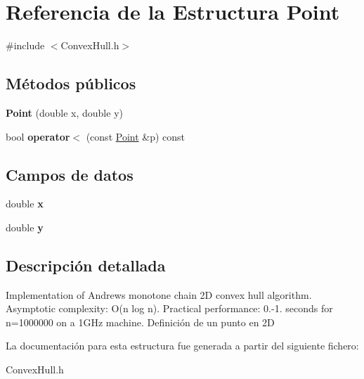 \hypertarget{structPoint}{}\section{Referencia de la Estructura Point}
\label{structPoint}


{\ttfamily \#include $<$Convex\+Hull.\+h$>$}

\subsection*{Métodos públicos}
\begin{DoxyCompactItemize}
\item 
\hypertarget{structPoint_a78b55e8d5466bb8c2cf60fa55f2562ff}{}{\bfseries Point} (double x, double y)\label{structPoint_a78b55e8d5466bb8c2cf60fa55f2562ff}

\item 
\hypertarget{structPoint_aa042f39cc8ef592350a152f407b15bce}{}bool {\bfseries operator$<$} (const \hyperlink{structPoint}{Point} \&p) const \label{structPoint_aa042f39cc8ef592350a152f407b15bce}

\end{DoxyCompactItemize}
\subsection*{Campos de datos}
\begin{DoxyCompactItemize}
\item 
\hypertarget{structPoint_ab99c56589bc8ad5fa5071387110a5bc7}{}double {\bfseries x}\label{structPoint_ab99c56589bc8ad5fa5071387110a5bc7}

\item 
\hypertarget{structPoint_afa38be143ae800e6ad69ce8ed4df62d8}{}double {\bfseries y}\label{structPoint_afa38be143ae800e6ad69ce8ed4df62d8}

\end{DoxyCompactItemize}


\subsection{Descripción detallada}
Implementation of Andrew\textquotesingle{}s monotone chain 2\+D convex hull algorithm. Asymptotic complexity\+: O(n log n). Practical performance\+: 0.-\/1. seconds for n=1000000 on a 1\+G\+Hz machine. Definición de un punto en 2\+D 

La documentación para esta estructura fue generada a partir del siguiente fichero\+:\begin{DoxyCompactItemize}
\item 
Convex\+Hull.\+h\end{DoxyCompactItemize}

